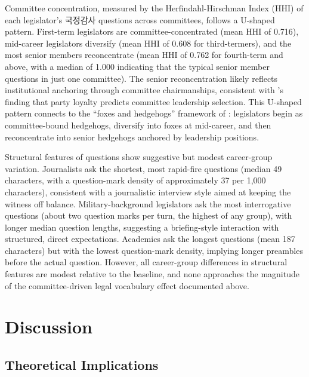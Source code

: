 \documentclass[11pt]{article}
\begin{document}
Committee concentration, measured by the Herfindahl-Hirschman Index (HHI) of each legislator's 국정감사 questions across committees, follows a U-shaped pattern. First-term legislators are committee-concentrated (mean HHI of 0.716), mid-career legislators diversify (mean HHI of 0.608 for third-termers), and the most senior members reconcentrate (mean HHI of 0.762 for fourth-term and above, with a median of 1.000 indicating that the typical senior member questions in just one committee). The senior reconcentration likely reflects institutional anchoring through committee chairmanships, consistent with \citet{kang2023}'s finding that party loyalty predicts committee leadership selection. This U-shaped pattern connects to the ``foxes and hedgehogs'' framework of \citet{martinez2022}: legislators begin as committee-bound hedgehogs, diversify into foxes at mid-career, and then reconcentrate into senior hedgehogs anchored by leadership positions.

Structural features of questions show suggestive but modest career-group variation. Journalists ask the shortest, most rapid-fire questions (median 49 characters, with a question-mark density of approximately 37 per 1,000 characters), consistent with a journalistic interview style aimed at keeping the witness off balance. Military-background legislators ask the most interrogative questions (about two question marks per turn, the highest of any group), with longer median question lengths, suggesting a briefing-style interaction with structured, direct expectations. Academics ask the longest questions (mean 187 characters) but with the lowest question-mark density, implying longer preambles before the actual question. However, all career-group differences in structural features are modest relative to the baseline, and none approaches the magnitude of the committee-driven legal vocabulary effect documented above.


\section{Discussion}
\label{sec:discussion}

\subsection{Theoretical Implications}
\end{document}
